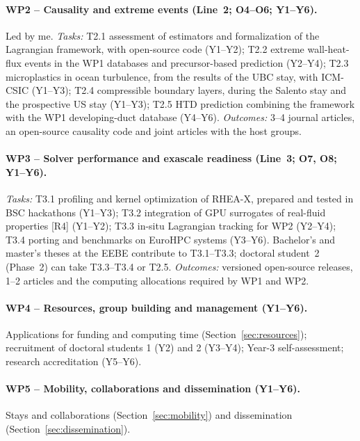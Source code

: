 \documentclass[11pt]{article}
\begin{document}
\paragraph{WP2 -- Causality and extreme events (Line~2; O4--O6; Y1--Y6).} Led by me.
\emph{Tasks:} T2.1 assessment of estimators and formalization of the Lagrangian framework,
with open-source code (Y1--Y2); T2.2 extreme wall-heat-flux events in the WP1 databases and
precursor-based prediction (Y2--Y4); T2.3 microplastics in ocean turbulence, from the results
of the UBC stay, with ICM-CSIC (Y1--Y3); T2.4 compressible boundary layers, during the
Salento stay and the prospective US stay (Y1--Y3); T2.5 HTD prediction combining the
framework with the WP1 developing-duct database (Y4--Y6).
\emph{Outcomes:} 3--4 journal articles, an open-source causality code and joint articles with
the host groups.

\paragraph{WP3 -- Solver performance and exascale readiness (Line~3; O7, O8; Y1--Y6).}
\emph{Tasks:} T3.1 profiling and kernel optimization of RHEA-X, prepared and tested in BSC
hackathons (Y1--Y3); T3.2 integration of GPU surrogates of real-fluid properties [R4] (Y1--Y2);
T3.3 in-situ Lagrangian tracking for WP2 (Y2--Y4); T3.4 porting and benchmarks on EuroHPC
systems (Y3--Y6). Bachelor's and master's theses at the EEBE contribute to T3.1--T3.3;
doctoral student~2 (Phase~2) can take T3.3--T3.4 or T2.5.
\emph{Outcomes:} versioned open-source releases, 1--2 articles and the computing allocations
required by WP1 and WP2.

\paragraph{WP4 -- Resources, group building and management (Y1--Y6).} Applications for
funding and computing time (Section~\ref{sec:resources}); recruitment of doctoral students
1 (Y2) and 2 (Y3--Y4); Year-3 self-assessment; research accreditation (Y5--Y6).

\paragraph{WP5 -- Mobility, collaborations and dissemination (Y1--Y6).} Stays and
collaborations (Section~\ref{sec:mobility}) and dissemination
(Section~\ref{sec:dissemination}).
\end{document}

